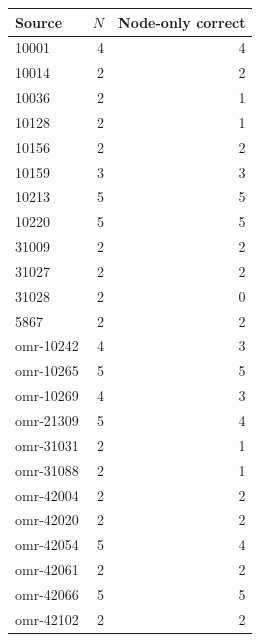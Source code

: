 \begin{tabularx}{\linewidth}{Xrr}
\toprule
Source & $N$ & Node-only correct\\\midrule
10001 & 4 & 4\\
10014 & 2 & 2\\
10036 & 2 & 1\\
10128 & 2 & 1\\
10156 & 2 & 2\\
10159 & 3 & 3\\
10213 & 5 & 5\\
10220 & 5 & 5\\
31009 & 2 & 2\\
31027 & 2 & 2\\
31028 & 2 & 0\\
5867 & 2 & 2\\
omr-10242 & 4 & 3\\
omr-10265 & 5 & 5\\
omr-10269 & 4 & 3\\
omr-21309 & 5 & 4\\
omr-31031 & 2 & 1\\
omr-31088 & 2 & 1\\
omr-42004 & 2 & 2\\
omr-42020 & 2 & 2\\
omr-42054 & 5 & 4\\
omr-42061 & 2 & 2\\
omr-42066 & 5 & 5\\
omr-42102 & 2 & 2\\
\bottomrule
\end{tabularx}
